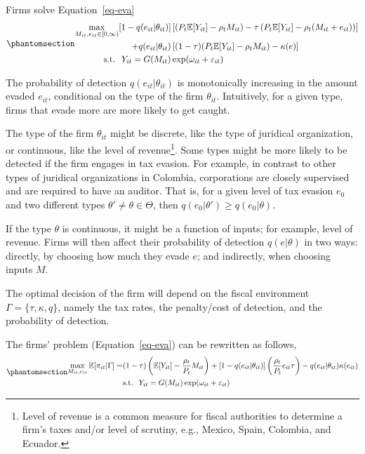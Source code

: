 \documentclass[
  12pt]{article}
\theoremstyle{definition}
\theoremstyle{remark}
\begin{document}
Firms solve Equation~\ref{eq-eva}
\begin{equation}\phantomsection\label{eq-eva}{
\begin{aligned}
  \max_{M_{it}, e_{it}\in [0,\infty)} [1-q(e_{it}|\theta_{it})]&\left[(P_t\mathbb{E}[Y_{it}]-\rho_{t} M_{it})-\tau\left(P_t\mathbb{E}[Y_{it}]-\rho_{t} (M_{it}+e_{it})\right)\right]\\
  +q(e_{it}|\theta_{it})&\left[(1-\tau)(P_t\mathbb{E}[Y_{it}]-\rho_{t} M_{it})-\kappa(e)\right] \\
  \text{s.t. }\; Y_{it}=G(M_{it})&\exp(\omega_{it}+\varepsilon_{it})
\end{aligned}
}\end{equation}

The probability of detection \(q(e_{it}|\theta_{it})\) is monotonically
increasing in the amount evaded \(e_{it}\), conditional on the type of
the firm \(\theta_{it}\). Intuitively, for a given type, firms that
evade more are more likely to get caught.

The type of the firm \(\theta_{it}\) might be discrete, like the type of
juridical organization, or continuous, like the level of
revenue\footnote{Level of revenue is a common measure for fiscal
  authorities to determine a firm's taxes and/or level of scrutiny,
  e.g., Mexico, Spain, Colombia, and Ecuador. }. Some
types might be more likely to be detected if the firm engages in tax
evasion. For example, in contrast to other types of juridical
organizations in Colombia, corporations are closely supervised and are
required to have an auditor. That is, for a given level of tax evasion
\(e_0\) and two different types
\(\theta' \not= \theta \in \mathbfcal{\Theta}\), then
\(q(e_0|\theta')\ge q(e_0|\theta)\).

If the type \(\theta\) is continuous, it might be a function of inputs;
for example, level of revenue. Firms will then affect their probability
of detection \(q(e|\theta)\) in two ways: directly, by choosing how much
they evade \(e\); and indirectly, when choosing inputs \(M\).

The optimal decision of the firm will depend on the fiscal environment
\(\Gamma=\{\tau, \kappa, q \}\), namely the tax rates, the penalty/cost
of detection, and the probability of detection.

The firms' problem (Equation~\ref{eq-eva}) can be rewritten as follows,
\begin{equation}\phantomsection\label{eq-eva-2}{
\begin{aligned}
  \max_{M_{it},e_{it}} \mathbb{E}[\pi_{it}|\Gamma] = &(1-\tau)\left(\mathbb{E}[Y_{it}]-\frac{\rho_{t}}{P_t} M_{it}\right)+[1-q(e_{it}|\theta_{it})]\left(\frac{\rho_{t}}{P_t}e_{it}\tau\right)
  -q(e_{it}|\theta_{it})\kappa(e_{it}) \\
  &\text{s.t. }\; Y_{it}=G(M_{it})\exp(\omega_{it}+\varepsilon_{it})
\end{aligned}
}\end{equation}
\end{document}
